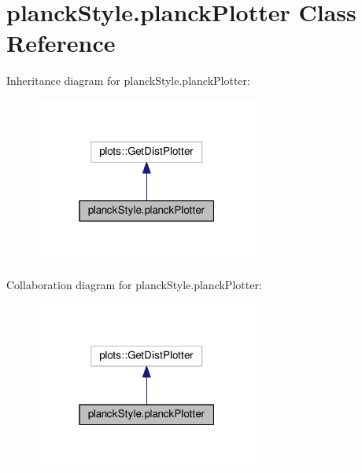 \hypertarget{classplanckStyle_1_1planckPlotter}{}\section{planck\+Style.\+planck\+Plotter Class Reference}
\label{classplanckStyle_1_1planckPlotter}


Inheritance diagram for planck\+Style.\+planck\+Plotter\+:
\nopagebreak
\begin{figure}[H]
\begin{center}
\leavevmode
\includegraphics[width=208pt]{classplanckStyle_1_1planckPlotter__inherit__graph}
\end{center}
\end{figure}


Collaboration diagram for planck\+Style.\+planck\+Plotter\+:
\nopagebreak
\begin{figure}[H]
\begin{center}
\leavevmode
\includegraphics[width=208pt]{classplanckStyle_1_1planckPlotter__coll__graph}
\end{center}
\end{figure}
